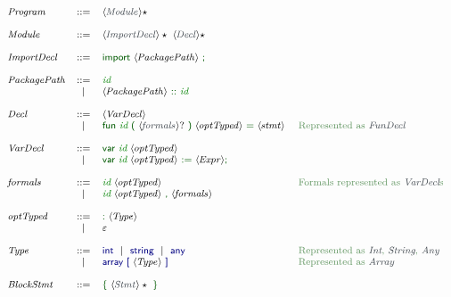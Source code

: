 \begin{figure}
    

\[\footnotesize
  \begin{array}[t]{lcl@{\hspace{0.4cm}}l}
    \nta{Program} & \Prod & \ntstar{Module} \\
    \\
    \nta{Module} & \Prod & \ntstar{ImportDecl}\ \ntstar{Decl}\\
    \\
    \nta{ImportDecl} & \Prod & \vterminal{import}\ \nt{PackagePath}\ \vterminal{;}\\
    \\
    \nta{PackagePath} & \Prod & \terminal{id}\\
                    & \VB   & \nt{PackagePath}\ \vterminal{::}\ \terminal{id} \\
    \\
    \nta{Decl} & \Prod & \nt{VarDecl}\ \\
                 & \VB & \vterminal{fun}\ \terminal{id}\ \vterminal{(}\ \ntq{formals}\ \vterminal{)}\ \nt{optTyped}\ \vterminal{=}\ \nt{stmt}  & \astmap{Represented as } \ntaX{FunDecl} \\
    \\
    \nta{VarDecl} & \Prod & \vterminal{var}\ \terminal{id}\ \nt{optTyped} \\
                  & \VB   & \vterminal{var}\ \terminal{id}\ \nt{optTyped}\ \vterminal{:=}\ \nt{Expr} \vterminal{;}\\
    \\
    \nta{formals} & \Prod & \terminal{id}\ \nt{optTyped} & \astmap{Formals represented as \ntaX{VarDecl}s} \\
                  & \VB & \terminal{id}\ \nt{optTyped}\ \vterminal{,}\ \nt{formals}\\
                \\
    \nta{optTyped} & \Prod & \vterminal{:}\ \nt{Type}\\
                  & \VB{} & \varepsilon \\
    \\
    \nta{Type} & \Prod & \Cty{int}\ \VB\ \Cty{string}\ \VB\ \Cty{any} & \astmap{Represented as \ntaX{Int}, \ntaX{String}, \ntaX{Any}}\\
               & \VB   & \Cty{array}\ \Cty{[}\ \nt{Type}\ \Cty{]} & \astmap{Represented as \ntaX{Array}}\\
    \\
    \nta{BlockStmt} & \Prod & \vterminal{\{}\ \ntstar{Stmt}\ \vterminal{\}} \\

\end{array}\]
\end{figure}
